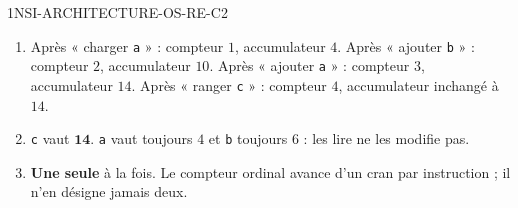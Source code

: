 \begin{corrige}{1NSI-ARCHITECTURE-OS-RE-C2}
\begin{enumerate}
  \item Après « charger \lstinline{a} » : compteur $1$, accumulateur $4$.
        Après « ajouter \lstinline{b} » : compteur $2$, accumulateur $10$.
        Après « ajouter \lstinline{a} » : compteur $3$, accumulateur $14$.
        Après « ranger \lstinline{c} » : compteur $4$, accumulateur inchangé à $14$.
  \item \lstinline{c} vaut $\mathbf{14}$. \lstinline{a} vaut toujours $4$ et \lstinline{b}
        toujours $6$ : les lire ne les modifie pas.
  \item \textbf{Une seule} à la fois. Le compteur ordinal avance d'un cran par instruction ;
        il n'en désigne jamais deux.
\end{enumerate}
\end{corrige}
